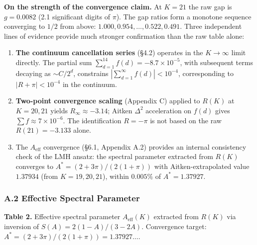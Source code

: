 \documentclass[
  11pt,
]{article}
\begin{document}
\textbf{On the strength of the convergence claim.} At \(K = 21\) the raw gap is
\(g = 0.0082\) (2.1 significant digits of \(\pi\)). The gap ratios form a
monotone sequence converging to \(1/2\) from above:
\(1.000, 0.954, \ldots, 0.522, 0.491\). Three independent lines of evidence
provide much stronger confirmation than the raw table alone:

\begin{enumerate}
\def\labelenumi{\arabic{enumi}.}
\item
  \textbf{The continuum cancellation series} (§4.2) operates in the
  \(K \to \infty\) limit directly. The partial sum
  \(\sum_{d=1}^{14} f(d) = -8.7 \times 10^{-5}\), with subsequent terms decaying
  as \(\sim C/2^d\), constrains \(|\sum_{d=1}^{\infty} f(d)| < 10^{-4}\),
  corresponding to \(|R + \pi| < 10^{-4}\) in the continuum.
\item
  \textbf{Two-point convergence scaling} (Appendix C) applied to \(R(K)\) at
  \(K = 20, 21\) yields \(R_\infty \approx -3.14\); Aitken \(\Delta^2\)
  acceleration on \(f(d)\) gives \(\sum f \approx 7 \times 10^{-6}\). The
  identification \(R = -\pi\) is not based on the raw \(R(21) = -3.133\) alone.
\item
  The \(A_{\mathrm{eff}}\) convergence (§6.1, Appendix A.2) provides an internal
  consistency check of the LMH ansatz: the spectral parameter extracted from
  \(R(K)\) converges to \(A^{\ast} = (2+3\pi)/(2(1+\pi))\) with
  Aitken-extrapolated value \(1.37934\) (from \(K = 19, 20, 21\)), within
  \(0.005\%\) of \(A^{\ast} = 1.37927\).
\end{enumerate}

\subsubsection{A.2 Effective Spectral
Parameter}\label{a.2-effective-spectral-parameter}

\textbf{Table 2.} Effective spectral parameter \(A_{\mathrm{eff}}(K)\) extracted
from \(R(K)\) via inversion of \(S(A) = 2(1-A)/(3-2A)\). Convergence target:
\(A^{\ast} = (2 + 3\pi)/(2(1+\pi)) = 1.37927\ldots\).
\end{document}
